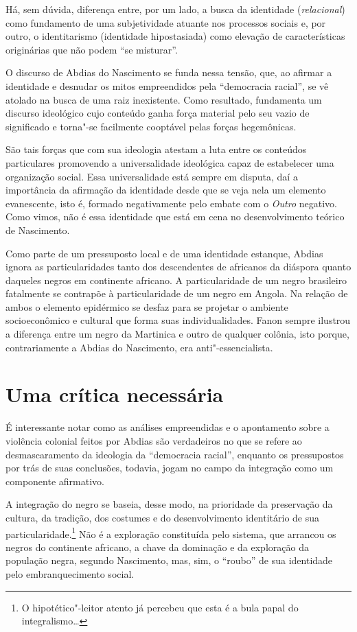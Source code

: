 Há, sem dúvida, diferença entre, por um lado, a busca da identidade
(\emph{relacional}) como fundamento de uma subjetividade atuante nos
processos sociais e, por outro, o identitarismo (identidade
hipostasiada) como elevação de características originárias que não podem
``se misturar''.

O discurso de Abdias do Nascimento se funda nessa tensão, que, ao
afirmar a identidade e desnudar os mitos empreendidos pela ``democracia
racial'', se vê atolado na busca de uma raiz inexistente. Como resultado,
fundamenta um discurso ideológico cujo conteúdo ganha força material
pelo seu vazio de significado e torna"-se facilmente cooptável pelas
forças hegemônicas.

São tais forças que com sua
ideologia atestam a luta entre os conteúdos particulares promovendo a
universalidade ideológica capaz de estabelecer uma organização social.
Essa universalidade está sempre em disputa, daí a importância da
afirmação da identidade desde que se veja nela um elemento evanescente,
isto é, formado negativamente pelo embate com o \emph{Outro} negativo.
Como vimos, não é essa identidade que está em cena no desenvolvimento
teórico de Nascimento.

Como parte de um pressuposto local e de uma identidade estanque, Abdias
ignora as particularidades tanto dos descendentes de africanos da
diáspora quanto daqueles negros em continente africano. A
particularidade de um negro brasileiro fatalmente se contrapõe à
particularidade de um negro em Angola. Na relação de ambos o elemento
epidérmico se desfaz para se projetar o ambiente socioeconômico e
cultural que forma suas individualidades. Fanon sempre ilustrou a
diferença entre um negro da Martinica e outro de qualquer colônia, isto
porque, contrariamente a Abdias do Nascimento, era anti"-essencialista.

\chapter{Uma crítica necessária}

É interessante notar como as análises empreendidas e o apontamento sobre
a violência colonial feitos por Abdias são verdadeiros no que se refere
ao desmascaramento da ideologia da ``democracia racial'', enquanto os
pressupostos por trás de suas conclusões, todavia, jogam no campo da
integração como um componente afirmativo.

A integração do negro se baseia, desse modo, na prioridade da
preservação da cultura, da tradição, dos costumes e do desenvolvimento
identitário de sua particularidade.\footnote{O hipotético"-leitor atento
  já percebeu que esta é a bula papal do integralismo\ldots{}} Não é a
exploração constituída pelo sistema, que arrancou os negros do
continente africano, a chave da dominação e da exploração da população
negra, segundo Nascimento, mas, sim, o ``roubo'' de sua identidade pelo
embranquecimento social.

